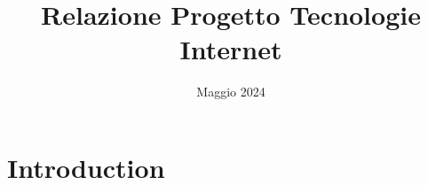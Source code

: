 \documentclass{article}
\title{Relazione Progetto Tecnologie Internet}
\author{ }
\date{Maggio 2024}
\begin{document}
\maketitle
\tableofcontents

\section{Introduction}

\end{document}
